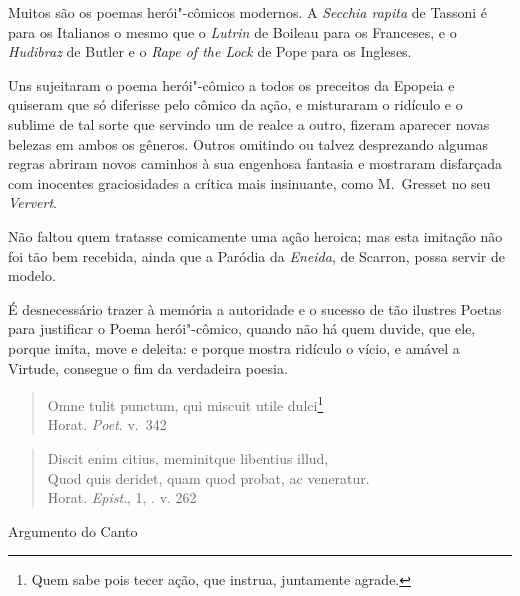 Muitos são os poemas herói"-cômicos modernos. A \textit{Secchia
rapita} de Tassoni é para os Italianos o mesmo que o \textit{Lutrin}	
de Boileau para os Franceses, e o \textit{Hudibraz} de Butler e o
\textit{Rape of the Lock} de Pope para os Ingleses.					\index{\Secch} \index{\Lutri} \index{\Tasson} %

Uns sujeitaram o poema herói"-cômico a todos os preceitos da 
Epopeia e quiseram que só diferisse pelo cômico da ação,				\index{\Comic} 
e misturaram o ridículo e o sublime de tal sorte que servindo um 
de realce a outro, fizeram aparecer novas belezas em ambos os 
gêneros. Outros omitindo ou talvez desprezando algumas regras
abriram novos caminhos à sua engenhosa fantasia e mostraram
disfarçada com inocentes graciosidades a crítica mais 
insinuante, como M.~Gresset no seu \textit{Ververt}.

Não faltou quem tratasse comicamente uma ação heroica; 
mas esta imitação não foi tão bem recebida, ainda que a 
Paródia da \textit{Eneida}, de Scarron, possa servir de modelo. 

É desnecessário trazer à memória a autoridade e o 
sucesso de tão ilustres Poetas para justificar o Poema 
herói"-cômico, quando não há quem duvide, que ele, 
porque imita, move e deleita: e porque mostra ridículo o 				\index{\Util}
vício, e amável a Virtude, consegue o fim da verdadeira poesia.

\begin{verse}
Omne tulit punctum, qui miscuit utile dulci\footnote{ Quem sabe pois
tecer ação, que instrua, juntamente agrade.}\\[10pt]

\hfill Horat. \textit{Poet}. v.~342 
\end{verse}

\medskip

\begin{verse}
Discit enim citius, meminitque libentius illud,\\[-15pt]
Quod quis deridet, quam quod probat, ac \qb{}veneratur. 
\\[10pt]

\hfill Horat. \textit{Epist}., 1, . v. 262
\end{verse}

\pagebreak
\paginabranca

\mbox{}\vfill
\thispagestyle{empty}
\noindent Argumento do Canto 
\medskip

